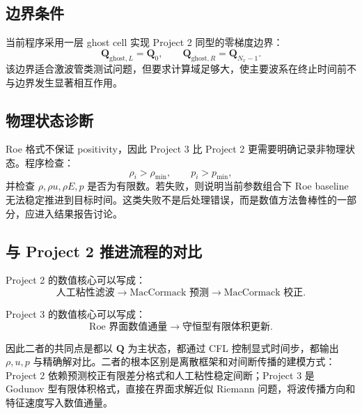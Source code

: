 \subsection{边界条件}

当前程序采用一层 ghost cell 实现 Project 2 同型的零梯度边界：
\begin{equation}
    \bm Q_{\mathrm{ghost},L}=\bm Q_0,
    \qquad
    \bm Q_{\mathrm{ghost},R}=\bm Q_{N_x-1}.
\end{equation}
该边界适合激波管类测试问题，但要求计算域足够大，使主要波系在终止时间前不与边界发生显著相互作用。

\subsection{物理状态诊断}

Roe 格式不保证 positivity，因此 Project 3 比 Project 2 更需要明确记录非物理状态。程序检查：
\begin{equation}
    \rho_i > \rho_{\min},
    \qquad
    p_i > p_{\min},
\end{equation}
并检查 \(\rho,\rho u,\rho E,p\) 是否为有限数。若失败，则说明当前参数组合下 Roe baseline 无法稳定推进到目标时间。这类失败不是后处理错误，而是数值方法鲁棒性的一部分，应进入结果报告讨论。

\subsection{与 Project 2 推进流程的对比}

Project 2 的数值核心可以写成：
\begin{equation}
    \text{人工粘性滤波}
    \longrightarrow
    \text{MacCormack 预测}
    \longrightarrow
    \text{MacCormack 校正}.
\end{equation}

Project 3 的数值核心可以写成：
\begin{equation}
    \text{Roe 界面数值通量}
    \longrightarrow
    \text{守恒型有限体积更新}.
\end{equation}

因此二者的共同点是都以 \(\bm Q\) 为主状态，都通过 CFL 控制显式时间步，都输出 \(\rho,u,p\) 与精确解对比。二者的根本区别是离散框架和对间断传播的建模方式：Project 2 依赖预测校正有限差分格式和人工粘性稳定间断；Project 3 是 Godunov 型有限体积格式，直接在界面求解近似 Riemann 问题，将波传播方向和特征速度写入数值通量。
